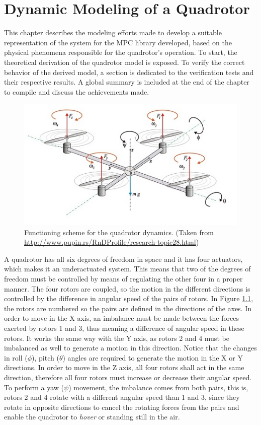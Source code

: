 \chapter{Dynamic Modeling of a Quadrotor}
\label{Dynamic_Modeling_of_a_Quadrotor}
\setcounter{MaxMatrixCols}{20}

This chapter describes the modeling efforts made to develop a suitable representation of the system for the MPC library developed, based on the physical phenomena responsible for the quadrotor's operation. To start, the theoretical derivation of the quadrotor model is exposed. To verify the correct behavior of the derived model, a section is dedicated to the verification tests and their respective results. A global summary is included at the end of the chapter to compile and discuss the achievements made.

\begin{figure}[h!]
\centering
\includegraphics{Images/Chapter3/quad_dynamics.jpg}
\caption{Functioning scheme for the quadrotor dynamics. (Taken from \url{http://www.pupin.rs/RnDProfile/research-topic28.html})}
\label{fig:quadrotor_dynamics}
\end{figure}

A quadrotor has all six degrees of freedom in space and it has four actuators, which makes it an underactuated system. This means that two of the degrees of freedom must be controlled by means of regulating the other four in a proper manner. The four rotors are coupled, so the motion in the different directions is controlled by the difference in angular speed of the pairs of rotors. In Figure \ref{fig:quadrotor_dynamics}, the rotors are numbered so the pairs are defined in the directions of the axes. In order to move in the X axis, an imbalance must be made between the forces exerted by rotors 1 and 3, thus meaning a difference of angular speed in these rotors. It works the same way with the Y axis, as rotors 2 and 4 must be imbalanced as well to generate a motion in this direction. Notice that the changes in roll ($\phi$), pitch ($\theta$) angles are required to generate the motion in the X or Y directions. In order to move in the Z axis, all four rotors shall act in the same direction, therefore all four rotors must increase or decrease their angular speed. To perform a yaw ($\psi$) movement, the imbalance comes from both pairs, this is, rotors 2 and 4 rotate with a different angular speed than 1 and 3, since they rotate in opposite directions to cancel the rotating forces from the pairs and enable the quadrotor to \emph{hover} or standing still in the air.	


